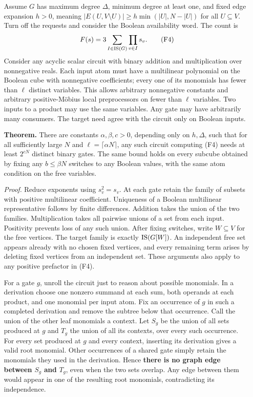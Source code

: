 \documentclass[
  11pt,
]{article}
\begin{document}
Assume \(G\) has maximum degree \(\Delta\), minimum degree at least one,
and fixed edge expansion \(h>0\), meaning
\(|E(U,V\setminus U)|\ge h\min(|U|,N-|U|)\) for all \(U\subseteq V\).
Turn off the requests and consider the Boolean availability word. The
count is \[
 F(s)=3\sum_{I\in{\rm IS}(G)}\prod_{v\in I}s_v.
 \tag{F4}
\] Consider any acyclic scalar circuit with binary addition and
multiplication over nonnegative reals. Each input atom must have a
multilinear polynomial on the Boolean cube with nonnegative
coefficients; every one of its monomials has fewer than \(\ell\)
distinct variables. This allows arbitrary nonnegative constants and
arbitrary positive-Möbius local preprocessors on fewer than \(\ell\)
variables. Two inputs to a product may use the same variables. Any gate
may have arbitrarily many consumers. The target need agree with the
circuit only on Boolean inputs.

\textbf{Theorem.} There are constants \(\alpha,\beta,c>0\), depending
only on \(h,\Delta\), such that for all sufficiently large \(N\) and
\(\ell=\lceil\alpha N\rceil\), any such circuit computing (F4) needs at
least \(2^{cN}\) distinct binary gates. The same bound holds on every
subcube obtained by fixing any \(b\le\beta N\) switches to any Boolean
values, with the same atom condition on the free variables.

\emph{Proof.} Reduce exponents using \(s_v^2=s_v\). At each gate retain
the family of subsets with positive multilinear coefficient. Uniqueness
of a Boolean multilinear representative follows by finite differences.
Addition takes the union of the two families. Multiplication takes all
pairwise unions of a set from each input. Positivity prevents loss of
any such union. After fixing switches, write \(W\subseteq V\) for the
free vertices. The target family is exactly \({\rm IS}(G[W])\). An
independent free set appears already with no chosen fixed vertices, and
every remaining term arises by deleting fixed vertices from an
independent set. These arguments also apply to any positive prefactor in
(F4).

For a gate \(g\), unroll the circuit just to reason about possible
monomials. In a derivation choose one nonzero summand at each sum, both
operands at each product, and one monomial per input atom. Fix an
occurrence of \(g\) in such a completed derivation and remove the
subtree below that occurrence. Call the union of the other leaf
monomials a context. Let \(S_g\) be the union of all sets produced at
\(g\) and \(T_g\) the union of all its contexts, over every such
occurrence. For every set produced at \(g\) and every context, inserting
its derivation gives a valid root monomial. Other occurrences of a
shared gate simply retain the monomials they used in the derivation.
Hence \textbf{there is no graph edge between \(S_g\) and \(T_g\)}, even
when the two sets overlap. Any edge between them would appear in one of
the resulting root monomials, contradicting its independence.
\end{document}
